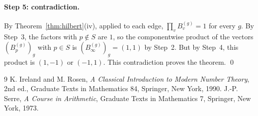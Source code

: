 \documentclass[11pt]{article}
\begin{document}
\paragraph{Step 5: contradiction.} By Theorem~\ref{thm:hilbert}(iv), applied to each edge, $\prod_vB^{(g)}_v=1$ for every $g$. By Step~3, the factors with $p\notin S$ are $1$, so the componentwise product of the vectors $(B^{(g)}_p)_g$ with $p\in S$ is $(B^{(g)}_\infty)_g=(1,1)$ by Step~2. But by Step~4, this product is $(1,-1)$ or $(-1,1)$. This contradiction proves the theorem.
\qed

\begin{thebibliography}{9}
 K. Ireland and M. Rosen, \emph{A Classical Introduction to Modern Number Theory}, 2nd ed., Graduate Texts in Mathematics 84, Springer, New York, 1990.
 J.-P. Serre, \emph{A Course in Arithmetic}, Graduate Texts in Mathematics 7, Springer, New York, 1973.
\end{thebibliography}
\end{document}
